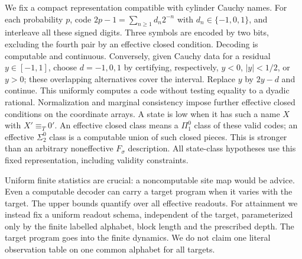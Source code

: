 We fix a compact representation compatible with cylinder Cauchy
names. For each probability $p$, code
$2p-1=\sum_{n\geq1}d_n2^{-n}$ with $d_n\in\{-1,0,1\}$,
and interleave all these signed digits. Three symbols are encoded
by two bits, excluding the fourth pair by an effective closed
condition. Decoding is computable and continuous. Conversely,
given Cauchy data for a residual $y\in[-1,1]$, choose $d=-1,0,1$
by certifying, respectively, $y<0$, $|y|<1/2$, or $y>0$;
these overlapping alternatives cover the interval. Replace $y$
by $2y-d$ and continue. This uniformly computes a code without
testing equality to a dyadic rational. Normalization and marginal
consistency impose further effective closed conditions on the
coordinate arrays. A state is low when it has such a name $X$
with $X'\equiv_T0'$.
An effective closed class means a $\Pi^0_1$ class of these valid
codes; an effective $\Sigma^0_2$ class is a computable union of
such closed pieces. This is stronger than an arbitrary noneffective
$F_\sigma$ description. All state-class hypotheses use this fixed
representation, including validity constraints.

Uniform finite statistics are crucial: a noncomputable site map
would be advice. Even a computable decoder can carry a target
program when it varies with the target. The upper bounds quantify
over all effective readouts. For attainment we instead fix a uniform
readout schema, independent of the target, parameterized only by
the finite labelled alphabet, block length and the prescribed depth.
The target program goes into the finite dynamics. We do not claim
one literal observation table on one common alphabet for all targets.
